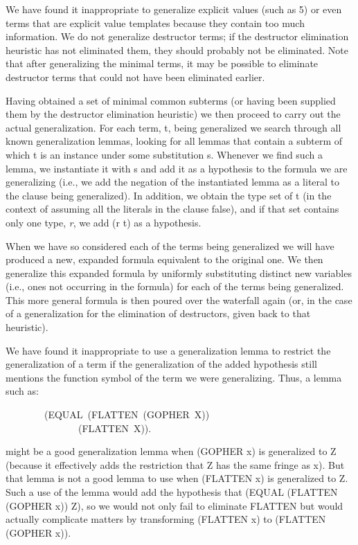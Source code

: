 \documentclass[11pt]{book}
\newenvironment{pubasis}{\begin{flushleft}\ttfamily\small}{\normalsize\rmfamily\end{flushleft}}
\newcommand{\pubinlineunderline}[1]{\emph{#1}}
\begin{document}
We have found it inappropriate to generalize explicit values (such as 5)
or even terms that are explicit value templates
because they contain
too much information.  We do not generalize destructor
terms; if the destructor elimination heuristic has not
eliminated them, they should probably not be eliminated.
Note that after generalizing the minimal terms,
it may be possible to eliminate destructor terms that
could not have been eliminated earlier.

Having obtained a set of minimal common subterms (or having been
supplied them by the  destructor elimination heuristic) we then proceed
to carry out the actual generalization.  For each term, t,
being generalized we search through all known generalization lemmas, looking
for all lemmas that contain a subterm of which t is
an instance under some substitution s.
Whenever we find such a lemma, we instantiate
it with s and add it as a hypothesis to the formula
we are generalizing (i.e., we add the negation of the instantiated lemma
as a literal to the clause being generalized).  In addition, we obtain the
type set of t (in the context of assuming all the literals in
the clause false), and if that set contains only one
type, \pubinlineunderline{r}, we add (r t) as a hypothesis.

When we have so considered each of the terms being generalized we will have
produced a new, expanded formula equivalent to the original one.
We then generalize this expanded formula by uniformly
substituting distinct 
new variables (i.e., ones not occurring in the formula) for
each of the terms being generalized.  This more general formula is then poured over the
waterfall again (or, in the case of a generalization for the elimination of
destructors, given back to that heuristic).

We have found it inappropriate to use a generalization lemma
to restrict the generalization of a term if the 
generalization of the added hypothesis 
still mentions the function symbol of the term we were generalizing.
Thus,  a lemma such as:
\begin{pubasis}
~~~~~~~~(EQUAL~(FLATTEN~(GOPHER~X))\\
~~~~~~~~~~~~~~~(FLATTEN~X)).\\
\end{pubasis}
might be a good generalization lemma when (GOPHER x) is generalized to Z
(because it effectively adds the restriction that Z
has the same fringe as x).  But that lemma is not
a good lemma to use when  (FLATTEN x) is generalized to Z.
Such a use of the lemma would add the hypothesis
that (EQUAL (FLATTEN (GOPHER x)) Z), so we would not only fail to eliminate FLATTEN but
would actually complicate matters by transforming (FLATTEN x) to
(FLATTEN (GOPHER x)).
\end{document}
